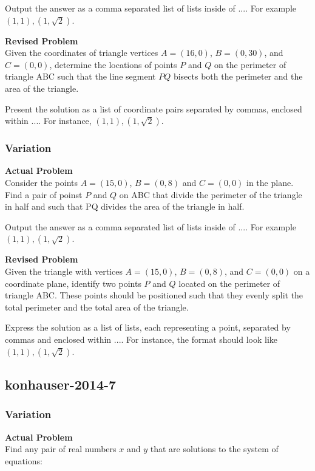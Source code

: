 Output the answer as a comma separated list of lists inside of $\boxed{...}$. For example $\boxed{(1,1), (1,\sqrt{2})}$.

\textbf{Revised Problem}\\
Given the coordinates of triangle vertices $A = (16, 0)$, $B = (0, 30)$, and $C=(0,0)$, determine the locations of points $P$ and $Q$ on the perimeter of triangle ABC such that the line segment $PQ$ bisects both the perimeter and the area of the triangle.

Present the solution as a list of coordinate pairs separated by commas, enclosed within $\boxed{...}$. For instance, $\boxed{(1,1), (1,\sqrt{2})}$.

\subsubsection{Variation}
\textbf{Actual Problem}\\
Consider the points $A = (15, 0)$, $B = (0, 8)$ and $C=(0,0)$ in the plane. Find a pair of poinst $P$ and $Q$ on ABC that divide the perimeter of the triangle in half and such that PQ divides the area of the triangle in half.

Output the answer as a comma separated list of lists inside of $\boxed{...}$. For example $\boxed{(1,1), (1,\sqrt{2})}$.

\textbf{Revised Problem}\\
Given the triangle with vertices $A = (15, 0)$, $B = (0, 8)$, and $C = (0,0)$ on a coordinate plane, identify two points $P$ and $Q$ located on the perimeter of triangle ABC. These points should be positioned such that they evenly split the total perimeter and the total area of the triangle.

Express the solution as a list of lists, each representing a point, separated by commas and enclosed within $\boxed{...}$. For instance, the format should look like $\boxed{(1,1), (1,\sqrt{2})}$.

\subsection{konhauser-2014-7}
\subsubsection{Variation}
\textbf{Actual Problem}\\
Find any pair of real numbers $x$ and $y$ that are solutions to the system of equations:

